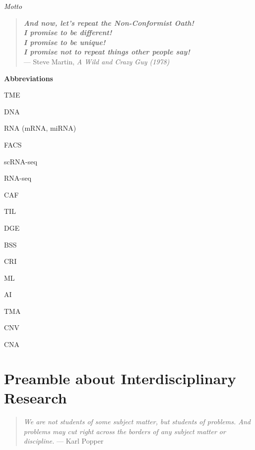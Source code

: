\documentclass[12pt,]{book}
\theoremstyle{definition}
\theoremstyle{definition}
\theoremstyle{definition}
\theoremstyle{remark}
\begin{document}
\newpage
\emph{Motto}
\vspace*{\fill}

 \begin{quote}
\emph{\textbf{And now, let's repeat the Non-Conformist Oath!\\
I promise to be different!\\
I promise to be unique!\\
I promise not to repeat things other people say!}}\\
— Steve Martin, \textit{A Wild and Crazy Guy (1978)}\\
 \end{quote}

 \vspace*{\fill}


{
\hypersetup{linkcolor=black}
\setcounter{tocdepth}{3}
\tableofcontents
}
\hypersetup{linkcolor=black}
\listoftables

\hypersetup{linkcolor=black}
\listoffigures
\newpage\thispagestyle{empty}

\vskip 1cm \huge{\textbf{Abbreviations}} \vskip 1cm \normalsize{}

TME

DNA

RNA (mRNA, miRNA)

FACS

scRNA-seq

RNA-seq

CAF

TIL

DGE

BSS

CRI

ML

AI

TMA

CNV

CNA

\newpage\thispagestyle{empty}

\hypertarget{preamble-about-interdisciplinary-research}{%
\chapter*{Preamble about Interdisciplinary
Research}\label{preamble-about-interdisciplinary-research}}

\setcounter{page}{17}

\begin{quote}
\emph{We are not students of some subject matter, but students of
problems. And problems may cut right across the borders of any subject
matter or discipline.} --- Karl Popper
\end{quote}
\end{document}
